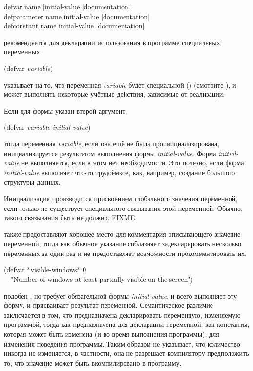 \begin{defmac}
defvar name [initial-value [documentation]] \\
defparameter name initial-value [documentation] \\
defconstant name initial-value [documentation]

 рекомендуется для декларации использования в программе специальных
переменных.
\begin{lisp}
(defvar \emph{variable})
\end{lisp}
указывает на то, что переменная \emph{variable} будет специальной
() (смотрите ), и может выполнять некоторые учётные
действия, зависимые от реализации.


Если для формы указан второй аргумент,
\begin{lisp}
(defvar \emph{variable} \emph{initial-value})
\end{lisp}
тогда переменная \emph{variable}, если она ещё не была проинициализирована,
инициализируется результатом выполнения формы \emph{initial-value}. Форма
\emph{initial-value} не выполняется, если в этом нет необходимости. Это
полезно, если форма \emph{initial-value} выполняет что-то
трудоёмкое, как, например, создание большого структуры данных.

Инициализация производится присвоением глобального значения переменной, если
только не существует специального связывания этой переменной.
Обычно, такого связывания быть не должно. FIXME.


 также предоставляют хорошее место для комментария описывающего
значение переменной, тогда как обычное  указание соблазняет
задекларировать несколько переменных за один раз и не предоставляет возможности
прокомментировать их.
\begin{lisp}
(defvar *visible-windows* 0 \\
~~"Number of windows at least partially visible on the screen")
\end{lisp}

 подобен , но  требует
обязательной формы \emph{initial-value}, и всего выполняет эту форму, и
присваивает результат переменной. Семантическое различие заключается в том, что
 предназначена декларировать переменную, изменяемую программой,
тогда как  предназначена для декларации переменной, как
константы, которая может быть изменена (и во время выполнения программы), для
изменения поведения программы. Таким образом  не указывает,
что количество никогда не изменяется, в частности, она не разрешает 
компилятору предположить то, что значение может быть вкомпилировано в
программу.


\end{defmac}
